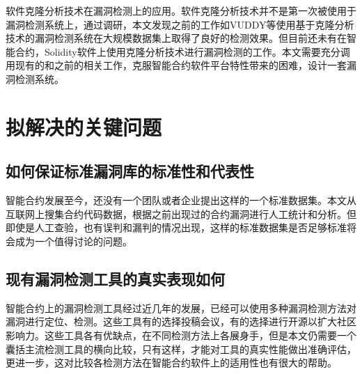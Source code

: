 %

软件克隆分析技术在漏洞检测上的应用。软件克隆分析技术并不是第一次被使用于漏洞检测系统上，通过调研，本文发现之前的工作如VUDDY\cite{vuddy}等使用基于克隆分析技术的漏洞检测系统在大规模数据集上取得了良好的检测效果。但目前还未有在智能合约，Solidity软件上使用克隆分析技术进行漏洞检测的工作。本文需要充分调用现有的和之前的相关工作，克服智能合约软件平台特性带来的困难，设计一套漏洞检测系统。

\section{拟解决的关键问题}

\subsection{如何保证标准漏洞库的标准性和代表性}

智能合约发展至今，还没有一个团队或者企业提出这样的一个标准数据集。本文从互联网上搜集合约代码数据，根据之前出现过的合约漏洞进行人工统计和分析。但即使是人工查验，也有误判和漏判的情况出现，这样的标准数据集是否足够标准将会成为一个值得讨论的问题。

\subsection{现有漏洞检测工具的真实表现如何}

智能合约上的漏洞检测工具经过近几年的发展，已经可以使用多种漏洞检测方法对漏洞进行定位、检测。这些工具有的选择投稿会议，有的选择进行开源以扩大社区影响力。这些工具各有优缺点，在不同检测方法上各展身手，但是本文仍需要一个囊括主流检测工具的横向比较，只有这样，才能对工具的真实性能做出准确评估，更进一步，这对比较各检测方法在智能合约软件上的适用性也有很大的帮助。


